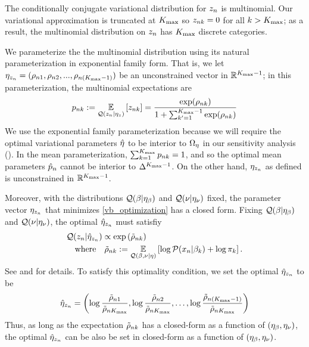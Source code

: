 
\begin{ex}
%
The conditionally conjugate variational distribution for $z_n$
is multinomial.
Our variational approximation is truncated at ${K_{\mathrm{max}}}$ so
$z_{nk} = 0$ for all $k > {K_{\mathrm{max}}}$;
as a result,
the multinomial distribution on $z_n$ has ${K_{\mathrm{max}}}$ discrete categories.


We parameterize the the multinomial distribution
using its natural parameterization
in exponential family form. That is,
we let $\eta_{z_n} = (\rho_{n1}, \rho_{n2}, ..., \rho_{n({K_{\mathrm{max}}}-1)})$
be an unconstrained vector in $\mathbb{R}^{{K_{\mathrm{max}}}-1}$;
in this parameterization, the multinomial expectations are
%
\begin{align*}
  p_{nk} := \underset{\mathcal{Q}(z_n \vert \eta_{z})}{\mathbb{E}}\left[z_{nk}\right] =
  \frac{\exp(\rho_{nk})}{1 + \sum_{k'=1}^{{K_{\mathrm{max}}}-1}\exp(\rho_{nk})}
\end{align*}
%
We use the exponential family parameterization because
we will require the optimal variational parameters $\hat\eta$
to be interior to $\Omega_{\eta}$ in our sensitivity analysis
().
In the mean parameterization,
$\sum_{k=1}^{K_{\mathrm{max}}} p_{nk} = 1$, and so the
optimal mean parameters $\hat p_{n}$ cannot be
interior to $\Delta^{{K_{\mathrm{max}}} - 1}$.
On the other hand, $\eta_{z_n}$ as defined
is unconstrained in $\mathbb{R}^{{K_{\mathrm{max}}} - 1}$.

Moreover, with the distributions $\mathcal{Q}(\beta\vert\eta_{\beta})$ and $\mathcal{Q}(\nu\vert\eta_{\nu})$ fixed,
the parameter vector $\eta_{z_n}$ that minimizes \eqref{vb_optimization}
has a closed form.
Fixing $\mathcal{Q}(\beta\vert\eta_{\beta})$ and $\mathcal{Q}(\nu\vert\eta_{\nu})$,
the optimal $\hat\eta_{z_n}$ must satisfiy
%
\begin{align*}
& \mathcal{Q}(z_n | \hat\eta_{z_n}) \propto \exp\left(\tilde \rho_{nk}\right)\\
& \quad\textrm{where}\quad \tilde \rho_{nk} := \underset{\mathcal{Q}(\beta, \nu \vert \eta)}{\mathbb{E}}\left[\log \mathcal{P}(x_n \vert \beta_k) + \log \pi_k\right].
\end{align*}
%
See \citet{bishop:2006:PRML} and \citet{blei:2017:vi_review} for details.
To satisfy this optimality condition,
we set the optimal $\hat\eta_{z_n}$ to be
%
\begin{align*}
%
\etaopt_{\z_\n} = \left(\log\frac{\tilde\rho_{\n1}}{\tilde\rho_{\n\kmax}},
\log\frac{\tilde\rho_{\n2}}{\tilde\rho_{\n\kmax}}, \ldots,
\log\frac{\tilde\rho_{\n(\kmax-1)}}{\tilde\rho_{\n\kmax}}\right)
%
\end{align*}
%
Thus, as long as the expectation $\tilde\rho_{nk}$ has a closed-form as a function of
$(\eta_{\beta}, \eta_{\nu})$, the optimal $\hat\eta_{z_n}$ can be also be set in closed-form as
a function of $(\eta_{\beta}, \eta_{\nu})$.
%
\end{ex}

